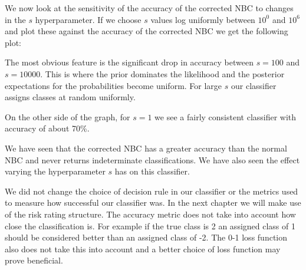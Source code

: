 We now look at the sensitivity of the accuracy of the corrected NBC to changes in the $s$ hyperparameter.
If we choose $s$ values log uniformly between $10^{0}$ and $10^{6}$ and plot these against the accuracy of the corrected NBC we get the following plot:
\begin{center}
\end{center}

The most obvious feature is the significant drop in accuracy between $s=100$ and $s=10000$.
This is where the prior dominates the likelihood and the posterior expectations for the probabilities become uniform.
For large $s$ our classifier assigns classes at random uniformly.

On the other side of the graph, for $s=1$ we see a fairly consistent classifier with accuracy of about 70\%.

We have seen that the corrected NBC has a greater accuracy than the normal NBC and never returns indeterminate classifications.
We have also seen the effect varying the hyperparameter $s$ has on this classifier.

We did not change the choice of decision rule in our classifier or the metrics used to measure how successful our classifier was.
In the next chapter we will make use of the risk rating structure.
The accuracy metric does not take into account how close the classification is.
For example if the true class is 2 an assigned class of 1 should be considered better than an assigned class of -2.
The 0-1 loss function also does not take this into account and a better choice of loss function may prove beneficial.